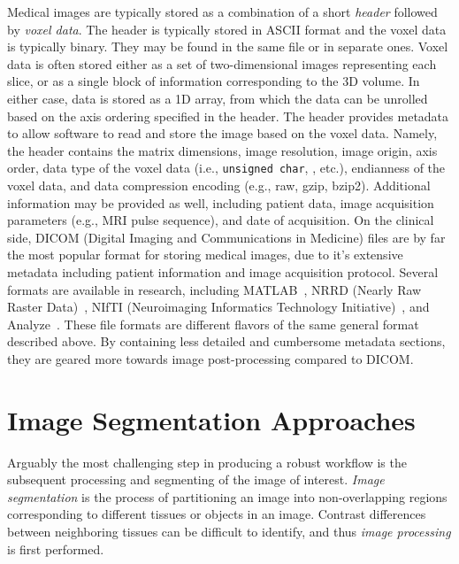 Medical images are typically stored as a combination of a short \textit{header} followed by \textit{voxel data}. The header is typically stored in ASCII format and the voxel data is typically binary. They may be found in the same file or in separate ones. Voxel data is often stored either as a set of two-dimensional images representing each slice, or as a single block of information corresponding to the 3D volume. In either case, data is stored as a 1D array, from which the data can be unrolled based on the axis ordering specified in the header. The header provides metadata to allow software to read and store the image based on the voxel data. Namely, the header contains the matrix dimensions, image resolution, image origin, axis order, data type of the voxel data (i.e., \texttt{unsigned char}, , etc.), endianness of the voxel data, and data compression encoding (e.g., raw, gzip, bzip2). Additional information may be provided as well, including patient data, image acquisition parameters (e.g., MRI pulse sequence), and date of acquisition. On the clinical side, DICOM (Digital Imaging and Communications in Medicine) files are by far the most popular format for storing medical images, due to it's extensive metadata including patient information and image acquisition protocol. Several formats are available in research, including MATLAB~\cite{MATLAB}, NRRD (Nearly Raw Raster Data)~\cite{nrrd}, NIfTI (Neuroimaging Informatics Technology Initiative)~\cite{nifti}, and Analyze~\cite{analyze}. These file formats are different flavors of the same general format described above. By containing less detailed and cumbersome metadata sections, they are geared more towards image post-processing compared to DICOM.

\section{Image Segmentation Approaches}
\label{Image Segmentation Approaches}

Arguably the most challenging step in producing a robust workflow is the subsequent processing and segmenting of the image of interest. \textit{Image segmentation} is the process of partitioning an image into non-overlapping regions corresponding to different tissues or objects in an image. Contrast differences between neighboring tissues can be difficult to identify, and thus \textit{image processing} is first performed.

